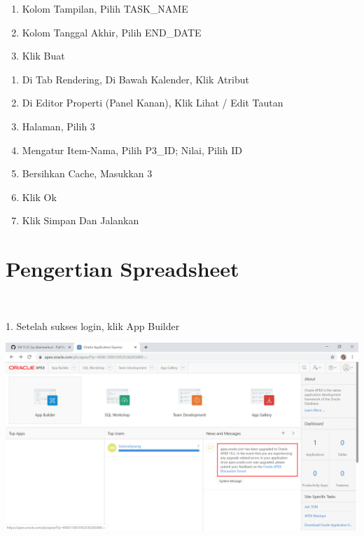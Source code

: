 \documentclass{article}
\begin{document}
\begin{enumerate}
\item Kolom Tampilan, Pilih TASK_NAME
\item Kolom Tanggal Akhir, Pilih END_DATE
\item Klik Buat

\end{enumerate}
\begin{enumerate}
    \item Di Tab Rendering, Di Bawah Kalender, Klik Atribut
    \item Di Editor Properti (Panel Kanan), Klik Lihat / Edit Tautan
    \item Halaman, Pilih 3
    \item Mengatur Item-Nama, Pilih P3_ID; Nilai, Pilih ID
    \item Bersihkan Cache, Masukkan 3
    \item Klik Ok
    \item Klik Simpan Dan Jalankan\\

\end{enumerate}

\section{Pengertian Spreadsheet}
\usepackage{Spreadsheet: Memungkinkan Pengguna Untuk Menyimpan Berbagai Informasi Yang Sangat Lengkap, Pada Setiap Kolomnya Bisa Menyimpan Berbagai Data Informasi Yang Berbeda Dari Informasi Yang Di Perlukan.}\\
\usepackage{App From Spreadsheet Disini Berupa Beberapa Project Dan Nama Tugas Nya Serta Keterangan Lainnya Seperti Tanggal Mulai, Tanggal Selesai, Status, Di Ttd Oleh,Biaya, Budget Tersedia, Dan Lebih Kurangnya Dari Budget.}


    \item 1.  Setelah sukses login, klik App Builder

\begin{center}
    \includegraphics[width=10cm\textwidth]{figure/1.png}
    \end{center}
    
\end{document}
